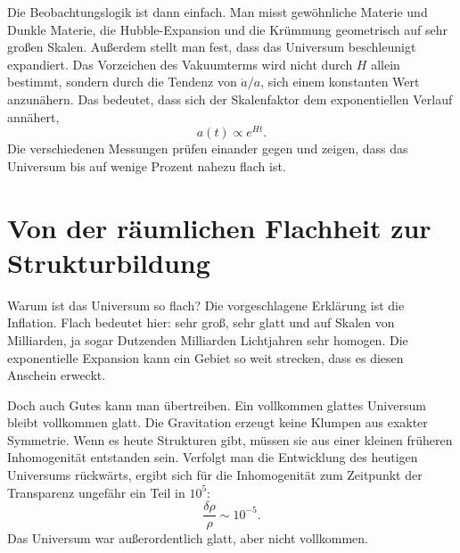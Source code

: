 Die Beobachtungslogik ist dann einfach. Man misst gewöhnliche Materie und Dunkle Materie, die Hubble-Expansion und die Krümmung geometrisch auf sehr großen Skalen. Außerdem stellt man fest, dass das Universum beschleunigt expandiert. Das Vorzeichen des Vakuumterms wird nicht durch \(H\) allein bestimmt, sondern durch die Tendenz von \(\dot a/a\), sich einem konstanten Wert anzunähern. Das bedeutet, dass sich der Skalenfaktor dem exponentiellen Verlauf annähert,
\begin{equation}
a(t)\propto e^{Ht}.
\end{equation}
Die verschiedenen Messungen prüfen einander gegen und zeigen, dass das Universum bis auf wenige Prozent nahezu flach ist.

\begin{classroomqa}
\end{classroomqa}

\begin{classroomqa}
\end{classroomqa}

\section{Von der räumlichen Flachheit zur Strukturbildung}

Warum ist das Universum so flach? Die vorgeschlagene Erklärung ist die Inflation. Flach bedeutet hier: sehr groß, sehr glatt und auf Skalen von Milliarden, ja sogar Dutzenden Milliarden Lichtjahren sehr homogen. Die exponentielle Expansion kann ein Gebiet so weit strecken, dass es diesen Anschein erweckt.

Doch auch Gutes kann man übertreiben. Ein vollkommen glattes Universum bleibt vollkommen glatt. Die Gravitation erzeugt keine Klumpen aus exakter Symmetrie. Wenn es heute Strukturen gibt, müssen sie aus einer kleinen früheren Inhomogenität entstanden sein. Verfolgt man die Entwicklung des heutigen Universums rückwärts, ergibt sich für die Inhomogenität zum Zeitpunkt der Transparenz ungefähr ein Teil in \(10^5\):
\begin{equation}
\frac{\delta\rho}{\rho}\sim 10^{-5}.
\end{equation}
Das Universum war außerordentlich glatt, aber nicht vollkommen.

